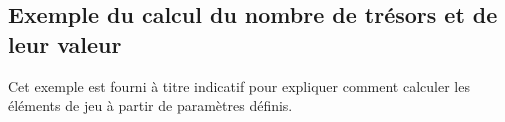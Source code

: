 \documentclass{pirategame}
\begin{document}
\subsection{Exemple du calcul du nombre de trésors et de leur valeur}

Cet exemple est fourni à titre indicatif pour expliquer comment calculer les éléments de jeu à partir de paramètres définis.

\end{document}
